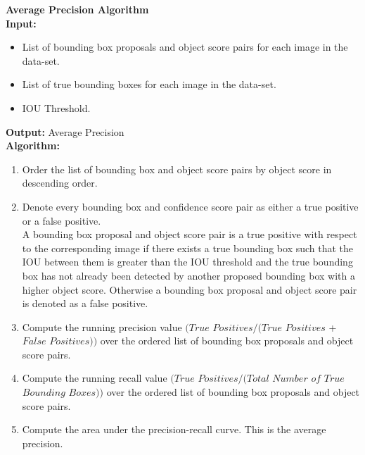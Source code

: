\documentclass{article}
\begin{document}
\begin{minipage}{1\textwidth}%
	\noindent \textbf{Average Precision Algorithm} \\

  \noindent \textbf{Input:} 
  	\begin{itemize}
  		\item List of bounding box proposals and object score pairs for each image in the data-set.
  		\item List of true bounding boxes for each image in the data-set.
  		\item IOU Threshold.
  	\end{itemize}
  
  \noindent \textbf{Output:} Average Precision \\
  
  \noindent \textbf{Algorithm:} \\
\end{minipage}%

\begin{enumerate}

  \item Order the list of bounding box and object score pairs by object score in descending order.
  
  \item Denote every bounding box and confidence score pair as either a true positive or a false positive. \\
  
  A bounding box proposal and object score pair is a true positive with respect to the corresponding image if there exists a true bounding box such that the IOU between them is greater than the IOU threshold and the true bounding box has not already been detected by another proposed bounding box with a higher object score.  Otherwise a bounding box proposal and object score pair is denoted as a false positive.
  
  \item Compute the running precision value $(True$  $Positives/ (True$ $Positives$ + $False$ $Positives))$ over the ordered list of bounding box proposals and object score pairs.
  
  \item Compute the running recall value $(True$ $Positives / (Total$ $Number$ $of$ $True$ $Bounding$ $Boxes))$ over the ordered list of bounding box proposals and object score pairs.
  
  \item Compute the area under the precision-recall curve.  This is the average precision.
  
\end{enumerate}
\end{document}
